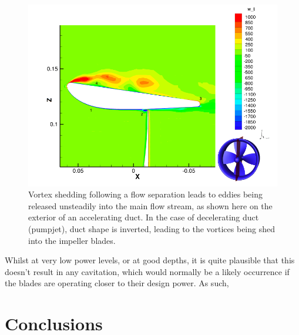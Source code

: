 \documentclass{article}\usepackage[]{graphicx}\usepackage[]{color}
\begin{document}
\begin{figure}
\includegraphics[width=\textwidth]{VortexShedding.png}
\caption{Vortex shedding following a flow separation leads to eddies being released unsteadily into the main flow stream, as shown here on the exterior of an accelerating duct.  In the case of decelerating duct (pumpjet), duct shape is inverted, leading to the vortices being shed into the impeller blades. \parencite{willemsen2013}}
\label{fig:VortexShedding.png}
\end{figure}

Whilst at very low power levels, or at good depths, it is quite plausible that this doesn't result in any cavitation, which would normally be a likely occurrence if the blades are operating closer to their design power. As such,

\section{Conclusions}

\end{document}

